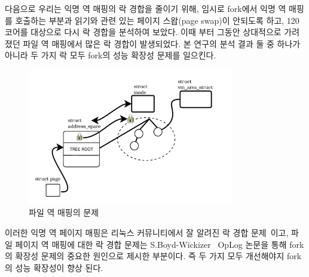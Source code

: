 다음으로 우리는 익명 역 매핑의 락 경합을 줄이기 위해, 임시로 fork에서 익명 역 매핑를 호출하는 부분과 
읽기와 관련 있는 페이지 스왑(page swap)이 안되도록 하고, 120코어를 대상으로 다시 락 경합을 분석하여 보았다.
이때 부터 그동안 상대적으로 가려졌던 파일 역 매핑에서 많은 락 경합이 발생되었다.
본 연구의 분석 결과 둘 중 하나가 아니라 두 가지 락 모두 fork의 성능 확장성 문제를 일으킨다.

 \begin{figure}[h]
    \centering
    \includegraphics[width=0.8\textwidth]{fig/file_rmap_default}
    \caption{파일 역 매핑의 문제}
  \label{fig:file_rmap_default}
\end{figure}




이러한 익명 역 페이지 매핑은 리눅스 커뮤니티에서 잘 알려진 락 경합
문제~\cite{Andi2011adding}이고, 파일 페이지 역 매핑에 대한 락
경합 문제는 S.Boyd-Wickizer~\cite{SilasBoydWickizerPth} OpLog 논문을 통해
 fork의 확장성 문제의 중요한 원인으로 제시한 부분이다.
즉 두 가지 모두 개선해야지 fork의 성능 확장성이 향상 된다. 

